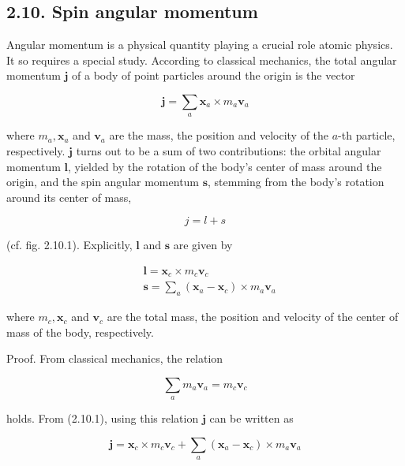 \documentclass{article}
\begin{document}
\subsection*{2.10. Spin angular momentum}

Angular momentum is a physical quantity playing a crucial role atomic physics. It so requires a special study. According to classical mechanics, the total angular momentum $\boldsymbol{j}$ of a body of point particles around the origin is the vector
 
\begin{equation*}
\boldsymbol{j}=\sum_{a} \boldsymbol{x}_{a} \times m_{a} \boldsymbol{v}_{a} \tag{2.10.1}
\end{equation*}
 
where $m_{a}, \boldsymbol{x}_{a}$ and $\boldsymbol{v}_{a}$ are the mass, the position and velocity of the $a$-th particle, respectively. $\boldsymbol{j}$ turns out to be a sum of two contributions: the orbital angular momentum $\boldsymbol{l}$, yielded by the rotation of the body's center of mass around the origin, and the spin angular momentum $\boldsymbol{s}$, stemming from the body's rotation around its center of mass,
 
\begin{equation*}
j=l+s \tag{2.10.2}
\end{equation*}
 
(cf. fig. 2.10.1). Explicitly, $\boldsymbol{l}$ and $\boldsymbol{s}$ are given by
 
\begin{align*}
& \boldsymbol{l}=\boldsymbol{x}_{c} \times m_{c} \boldsymbol{v}_{c}  \tag{2.10.3}\\
& \boldsymbol{s}=\sum_{a}\left(\boldsymbol{x}_{a}-\boldsymbol{x}_{c}\right) \times m_{a} \boldsymbol{v}_{a} \tag{2.10.4}
\end{align*}
 
where $m_{c}, \boldsymbol{x}_{c}$ and $\boldsymbol{v}_{c}$ are the total mass, the position and velocity of the center of mass of the body, respectively.

Proof. From classical mechanics, the relation
 
\begin{equation*}
\sum_{a} m_{a} \boldsymbol{v}_{a}=m_{c} \boldsymbol{v}_{c} \tag{2.10.5}
\end{equation*}
 
holds. From (2.10.1), using this relation $\boldsymbol{j}$ can be written as
 
\begin{equation*}
\boldsymbol{j}=\boldsymbol{x}_{c} \times m_{c} \boldsymbol{v}_{c}+\sum_{a}\left(\boldsymbol{x}_{a}-\boldsymbol{x}_{c}\right) \times m_{a} \boldsymbol{v}_{a} \tag{2.10.6}
\end{equation*}
 
\end{document}
